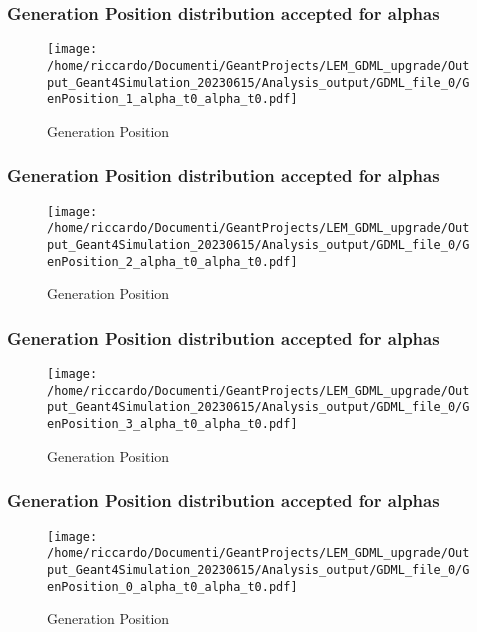 \documentclass[8pt]{beamer}
\begin{document}
        \begin{frame}
            \frametitle{Generation Position distribution accepted for alphas}
        
        \begin{figure}[h]
            \centering
            \texttt{[image: /home/riccardo/Documenti/GeantProjects/LEM\_GDML\_upgrade/Output\_Geant4Simulation\_20230615/Analysis\_output/GDML\_file\_0/GenPosition\_1\_alpha\_t0\_alpha\_t0.pdf]}
            \caption{Generation Position}
        \end{figure}
        
        \end{frame}
        
        \begin{frame}
            \frametitle{Generation Position distribution accepted for alphas}
        
        \begin{figure}[h]
            \centering
            \texttt{[image: /home/riccardo/Documenti/GeantProjects/LEM\_GDML\_upgrade/Output\_Geant4Simulation\_20230615/Analysis\_output/GDML\_file\_0/GenPosition\_2\_alpha\_t0\_alpha\_t0.pdf]}
            \caption{Generation Position}
        \end{figure}
        
        \end{frame}
        
        \begin{frame}
            \frametitle{Generation Position distribution accepted for alphas}
        
        \begin{figure}[h]
            \centering
            \texttt{[image: /home/riccardo/Documenti/GeantProjects/LEM\_GDML\_upgrade/Output\_Geant4Simulation\_20230615/Analysis\_output/GDML\_file\_0/GenPosition\_3\_alpha\_t0\_alpha\_t0.pdf]}
            \caption{Generation Position}
        \end{figure}
        
        \end{frame}
        
        \begin{frame}
            \frametitle{Generation Position distribution accepted for alphas}
        
        \begin{figure}[h]
            \centering
            \texttt{[image: /home/riccardo/Documenti/GeantProjects/LEM\_GDML\_upgrade/Output\_Geant4Simulation\_20230615/Analysis\_output/GDML\_file\_0/GenPosition\_0\_alpha\_t0\_alpha\_t0.pdf]}
            \caption{Generation Position}
        \end{figure}
        
        \end{frame}
        
\end{document}
